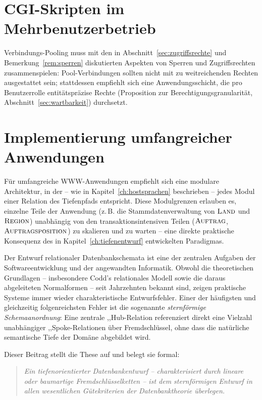 ﻿\documentclass[a4paper,12pt]{report}
\theoremstyle{definition}
\theoremstyle{remark}
\begin{document}
\section{CGI-Skripten im Mehrbenutzerbetrieb}

Verbindungs-Pooling muss mit den in
Abschnitt~\ref{sec:zugriffsrechte} und
Bemerkung~\ref{rem:sperren} diskutierten Aspekten von Sperren und
Zugriffsrechten zusammenspielen: Pool-Verbindungen sollten nicht mit
zu weitreichenden Rechten ausgestattet sein; stattdessen empfiehlt
sich eine Anwendungsschicht, die pro Benutzerrolle entitätspräzise
Rechte (Proposition zur Berechtigungsgranularität,
Abschnitt~\ref{sec:wartbarkeit}) durchsetzt.

\section{Implementierung umfangreicher Anwendungen}

Für umfangreiche WWW-Anwendungen empfiehlt sich eine modulare
Architektur, in der -- wie in Kapitel~\ref{ch:hostsprachen}
beschrieben -- jedes Modul einer Relation des Tiefenpfads entspricht.
Diese Modulgrenzen erlauben es, einzelne Teile der Anwendung (z.\,B.
die Stammdatenverwaltung von $\textsc{Land}$ und $\textsc{Region}$)
unabhängig von den transaktionsintensiven Teilen
($\textsc{Auftrag}$, $\textsc{Auftragsposition}$) zu skalieren und zu
warten -- eine direkte praktische Konsequenz des in
Kapitel~\ref{ch:tiefenentwurf} entwickelten Paradigmas.

\label{ch:tiefenentwurf}

\label{sec:einleitung}

Der Entwurf relationaler Datenbankschemata ist eine der zentralen Aufgaben der
Softwareentwicklung und der angewandten Informatik. Obwohl die theoretischen
Grundlagen -- insbesondere Codd's relationales Modell \cite{Codd1970} sowie die
daraus abgeleiteten Normalformen \cite{Codd1974, Date2003} -- seit Jahrzehnten
bekannt sind, zeigen praktische Systeme immer wieder charakteristische
Entwurfsfehler. Einer der häufigsten und gleichzeitig folgenreichsten Fehler ist
die sogenannte \emph{sternförmige Schemaanordnung}: Eine zentrale
,,Hub\grqq{}-Relation referenziert direkt eine Vielzahl unabhängiger
,,Spoke\grqq{}-Relationen über Fremdschlüssel, ohne dass die natürliche semantische
Tiefe der Domäne abgebildet wird.

Dieser Beitrag stellt die These auf und belegt sie formal:
\begin{quote}
\emph{Ein tiefenorientierter Datenbankentwurf -- charakterisiert durch lineare
oder baumartige Fremdschlüsselketten -- ist dem sternförmigen Entwurf in allen
wesentlichen Gütekriterien der Datenbanktheorie überlegen.}
\end{quote}
\end{document}
